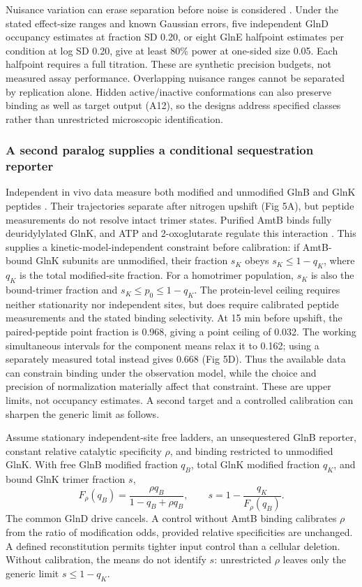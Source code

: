 \documentclass[10pt,letterpaper]{article}
\begin{document}
Nuisance variation can erase separation before noise is considered \cite{r70}. Under the stated effect-size ranges and known Gaussian errors, five independent GlnD occupancy estimates at fraction SD 0.20, or eight GlnE halfpoint estimates per condition at log SD 0.20, give at least 80\% power at one-sided size 0.05. Each halfpoint requires a full titration. These are synthetic precision budgets, not measured assay performance. Overlapping nuisance ranges cannot be separated by replication alone. Hidden active/inactive conformations can also preserve binding as well as target output (A12), so the designs address specified classes rather than unrestricted microscopic identification.

\subsubsection*{A second paralog supplies a conditional sequestration reporter}

Independent in vivo data measure both modified and unmodified GlnB and GlnK peptides \cite{r7}. Their trajectories separate after nitrogen upshift (Fig 5A), but peptide measurements do not resolve intact trimer states. Purified AmtB binds fully deuridylylated GlnK, and ATP and 2-oxoglutarate regulate this interaction \cite{r77}. This supplies a kinetic-model-independent constraint before calibration: if AmtB-bound GlnK subunits are unmodified, their fraction $s_K$ obeys $s_K\leq1-q_K$, where $q_K$ is the total modified-site fraction. For a homotrimer population, $s_K$ is also the bound-trimer fraction and $s_K\leq p_0\leq1-q_K$. The protein-level ceiling requires neither stationarity nor independent sites, but does require calibrated peptide measurements and the stated binding selectivity. At 15 min before upshift, the paired-peptide point fraction is 0.968, giving a point ceiling of 0.032. The working simultaneous intervals for the component means relax it to 0.162; using a separately measured total instead gives 0.668 (Fig 5D). Thus the available data can constrain binding under the observation model, while the choice and precision of normalization materially affect that constraint. These are upper limits, not occupancy estimates. A second target and a controlled calibration can sharpen the generic limit as follows.

Assume stationary independent-site free ladders, an unsequestered GlnB reporter, constant relative catalytic specificity $\rho$, and binding restricted to unmodified GlnK. With free GlnB modified fraction $q_B$, total GlnK modified fraction $q_K$, and bound GlnK trimer fraction $s$,
\[
 F_\rho(q_B)=\frac{\rho q_B}{1-q_B+\rho q_B},\qquad
 s=1-\frac{q_K}{F_\rho(q_B)}.
\]
The common GlnD drive cancels. A control without AmtB binding calibrates $\rho$ from the ratio of modification odds, provided relative specificities are unchanged. A defined reconstitution permits tighter input control than a cellular deletion. Without calibration, the means do not identify $s$: unrestricted $\rho$ leaves only the generic limit $s\leq1-q_K$.
\end{document}
